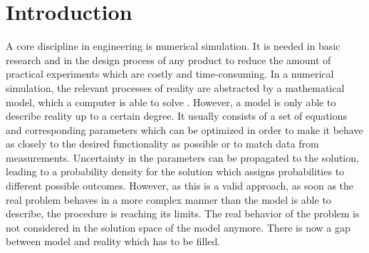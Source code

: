 \documentclass[%
  a4paper,oneside,%
  11pt,%
  smallchapters,
  style=printdev,
  extramargin,
  green,%
  rgb, <cmyk>
  ]{tubsbook}
\begin{document}
%
%

			







\printnomenclature[6em]


\chapter{Introduction}

A core discipline in engineering is numerical simulation. It is needed in basic research and in the design process of any product to reduce the amount of practical experiments which are costly and time-consuming. In a numerical simulation, the relevant processes of reality are abstracted by a mathematical model, which a computer is able to solve \cite{Weisberg2015}.  However, a model is only able to describe reality up to a certain degree. It usually consists of a set of equations and corresponding parameters which can be optimized in order to make it behave as closely to the desired functionality as possible or to match data from measurements. Uncertainty in the parameters can be propagated to the solution, leading to a probability density for the solution which assigns probabilities to different possible outcomes. However, as this is a valid approach, as soon as the real problem behaves in a more complex manner than the model is able to describe, the procedure is reaching its limits. The real behavior of the problem is not considered in the solution space of the model anymore. %
There is now a gap between model and reality which has to be filled.
\end{document}
